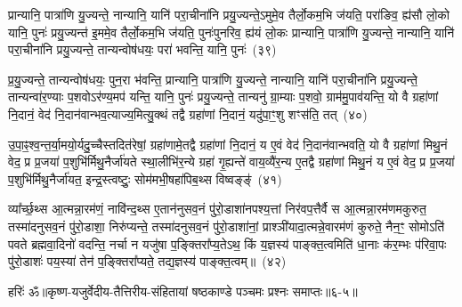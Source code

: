 {\anuvakamend[{यथा॑ पि॒ता तस्मा॑दप॒क्राम॑ति ता॒दृगे॒व तद्यद॒ष्टाद॑श च}]}%

प्रान्यानि॒ पात्रा॑णि यु॒ज्यन्ते॒ नान्यानि॒ यानि॑ परा॒चीना॑नि प्रयु॒ज्यन्ते॒\-ऽमुमे॒व तैर्लो॒कम॒भि ज॑यति॒ परा॑ङिव॒ ह्य॑सौ लो॒को यानि॒ पुनः॑ प्रयु॒ज्यन्त॑ इ॒ममे॒व तैर्लो॒कम॒भि ज॑यति॒ पुनः॑पुनरिव॒ ह्य॑यं लो॒कः प्रान्यानि॒ पात्रा॑णि यु॒ज्यन्ते॒ नान्यानि॒ यानि॑ परा॒चीना॑नि प्रयु॒ज्यन्ते॒ तान्यन्वोष॑धयः॒ परा॑ भवन्ति॒ यानि॒ पुनः॑~(३९)\ip

प्र॒यु॒ज्यन्ते॒ तान्यन्वोष॑धयः॒ पुन॒रा भ॑वन्ति॒ प्रान्यानि॒ पात्रा॑णि यु॒ज्यन्ते॒ नान्यानि॒ यानि॑ परा॒चीना॑नि प्रयु॒ज्यन्ते॒ तान्यन्वा॑र॒ण्याः प॒शवो\-ऽर॑ण्य॒मप॑ यन्ति॒ यानि॒ पुनः॑ प्रयु॒ज्यन्ते॒ तान्यनु॑ ग्रा॒म्याः प॒शवो॒ ग्राम॑मु॒पाव॑यन्ति॒ यो वै ग्रहा॑णां नि॒दानं॒ वेद॑ नि॒दान॑वान्भव॒त्याज्य॒मित्यु॒क्थं तद्वै ग्रहा॑णां नि॒दानं॒ यदु॑पा॒ꣳ॒शु शꣳस॑ति॒ तत्~(४०)\ip

उ॒पा॒ꣴ॒श्व॒न्त॒र्या॒मयो॒र्यदु॒च्चैस्तदित॑रेषां॒ ग्रहा॑णामे॒तद्वै ग्रहा॑णां नि॒दानं॒ य ए॒वं वेद॑ नि॒दान॑वान्भवति॒ यो वै ग्रहा॑णां मिथु॒नं वेद॒ प्र प्र॒जया॑ प॒शुभि॑र्मिथु॒नैर्जा॑यते स्था॒लीभि॑र॒न्ये ग्रहा॑ गृ॒ह्यन्ते॑ वाय॒व्यै॑र॒न्य ए॒तद्वै ग्रहा॑णां मिथु॒नं य ए॒वं वेद॒ प्र प्र॒जया॑ प॒शुभि॑र्मिथु॒नैर्जा॑यत॒ इन्द्र॒स्त्वष्टुः॒ सोम॑मभी॒षहा॑पिब॒थ्स विष्वङ्ङ्॑~(४१)\ip

व्या᳚र्च्छ॒थ्स आ॒त्मन्ना॒रम॑णं॒ नावि॑न्द॒थ्स ए॒तान॑नुसव॒नं पु॑रो॒डाशा॑नपश्य॒त्तां निर॑वप॒त्तैर्वै स आ॒त्मन्ना॒रम॑णमकुरुत॒ तस्मा॑दनुसव॒नं पु॑रो॒डाशा॒ निरु॑प्यन्ते॒ तस्मा॑दनुसव॒नं पु॑रो॒डाशा॑नां॒ प्राश्ञी॑यादा॒त्मन्ने॒वारम॑णं कुरुते॒ नैन॒ꣳ॒ सोमो\-ऽति॑ पवते ब्रह्मवा॒दिनो॑ वदन्ति॒ नर्चा न यजु॑षा प॒ङ्क्तिरा᳚प्य॒ते\-ऽथ॒ किं य॒ज्ञस्य॑ पाङ्क्त॒त्वमिति॑ धा॒नाः क॑र॒म्भः प॑रिवा॒पः पु॑रो॒डाशः॑ पय॒स्या॑ तेन॑ प॒ङ्क्तिरा᳚प्यते॒ तद्य॒ज्ञस्य॑ पाङ्क्त॒त्वम्॥~(४२)\ip

{\anuvakamend[{भ॒व॒न्ति॒ यानि॒ पुनः॒ शꣳस॑ति॒ तद्विष्व॒ङ्किञ्चतु॑र्दश च}]}%

{हरिः॑ ॐ}{॥कृष्ण-यजुर्वेदीय-तैत्तिरीय-संहितायां षष्ठकाण्डे पञ्चमः प्रश्नः समाप्तः॥६-५॥}


